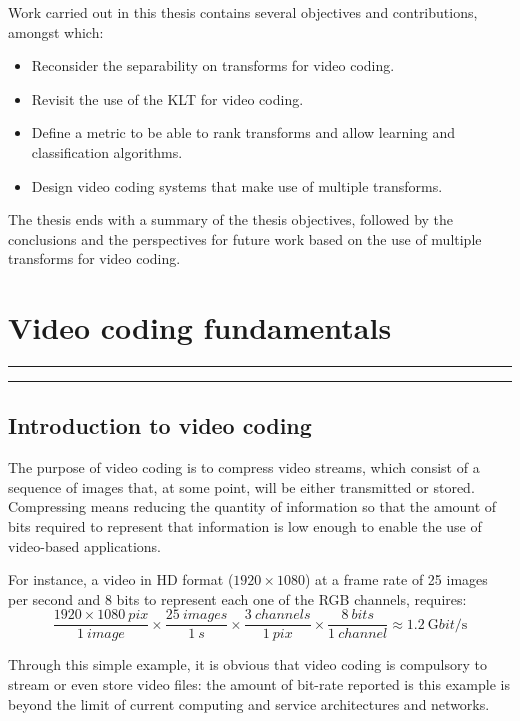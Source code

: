 \documentclass[11pt,a4paper,openright,twoside]{book}
\providecommand{\chaptertoc}{
	\startcontents[chapters]
	\hrule
	\vspace{1em}
	\printcontents[chapters]{}{1}{{\sf\large\bfseries Contents}}
	\vspace{1em}
	\hrule
}
\numberwithin{equation}{section} %
\numberwithin{figure}{section} %
\numberwithin{table}{section} %
\begin{document}
Work carried out in this thesis contains several objectives and contributions,
amongst which:
\begin{itemize}
	\item Reconsider the separability on transforms for video coding.
	\item Revisit the use of the \acs{KLT} for video coding.
	\item Define a metric to be able to rank transforms and allow learning and
		classification algorithms.
	\item Design video coding systems that make use of multiple transforms.
\end{itemize}

The thesis ends with a summary of the thesis objectives, followed by the
conclusions and the perspectives for future work based on the use of multiple
transforms for video coding.

\acresetall %

\chapter{Video coding fundamentals}
\label{cha:video_coding_fundamentals}
\chaptertoc

\section{Introduction to video coding}
\label{sec:introduction_to_video_coding}

The purpose of video coding is to compress video streams, which consist of a
sequence of images that, at some point, will be either transmitted or stored.
Compressing means reducing the quantity of information so that the amount of
bits required to represent that information is low enough to enable the use of
video-based applications.

For instance, a video in \ac{HD} format ($1920 \times 1080$)
at a frame rate of 25 images per second and 8 bits to represent each one
of the \ac{RGB} channels, requires:
\[
	\frac{1920\times\SI{1080}{pix}}{\SI{1}{image}}
	\times \frac{\SI{25}{images}}{\SI{1}{s}}
	\times \frac{\SI{3}{channels}}{\SI{1}{pix}}
	\times \frac{\SI{8}{bits}}{\SI{1}{channel}}
	\approx \SI{1.2}{\giga bit/\second}
\]

Through this simple example, it is obvious that video coding is compulsory
to stream or even store video files:
the amount of bit-rate reported is this example is beyond the limit of current
computing and service architectures and networks.
\end{document}

